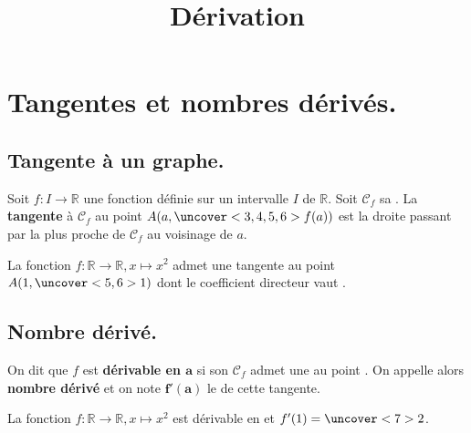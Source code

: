 \documentclass{beamer}
\date{}
\title{Dérivation}
\newcommand{\R}{\mathbb{R}}
\begin{document}
  
  \begin{frame}
    
    \titlepage
    
  \end{frame}
  
   \section{Tangentes et nombres dérivés.}
  
  \subsection{Tangente à un graphe.}
  
  \begin{frame}
  
  \begin{definition}    
    Soit $f:I \to \R$ une fonction définie sur un 
    intervalle $I$ de $\R$. Soit $\mathcal{C}_f$ sa 
    .
    La \textbf{tangente} à $\mathcal{C}_f$ au point 
    $A(a,\uncover<3,4,5,6>{f(a)})$ est la droite passant par 
     la plus proche de $\mathcal{C}_f$ 
    au voisinage de $a$.
  \end{definition}
  
   \begin{example}
   
   La fonction $f:\R \to \R, x \mapsto x^2$ admet une tangente 
   au point $A(1,\uncover<5,6>{1})$ dont le coefficient
   directeur vaut .
   
  \end{example}
  
  \end{frame}
    
  \subsection{Nombre dérivé.} 
  
  \begin{frame}
  
  \begin{definition}
  On dit que $f$ est \textbf{dérivable en $\mathbf{a}$} si 
  son  $\mathcal{C}_f$ admet une 
   au point . 
  On appelle alors \textbf{nombre dérivé} et on note 
  $\mathbf{f'(a)}$ le 
  de cette tangente.
  \end{definition}
  
   \begin{example}
   
   La fonction $f:\R \to \R, x \mapsto x^2$  est dérivable en 
    et $f'(1)=\uncover<7>{2}$.
   
  \end{example}
  
  \end{frame}
  
\end{document}
